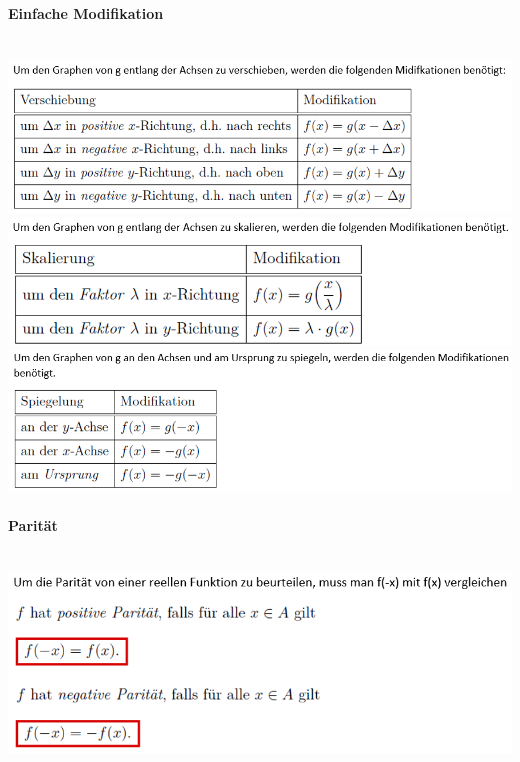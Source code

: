 \paragraph{Einfache Modifikation}\mbox{}\\
\noindent
\includegraphics[width=\columnwidth]{./images/mod.png}
\includegraphics[width=\columnwidth]{./images/mod1.png}
\includegraphics[width=\columnwidth]{./images/mod2.png}
\vspace{1mm}

\paragraph{Parität}\mbox{}\\
\noindent
\includegraphics[width=\columnwidth]{./images/paritat.png}
\vspace{1mm}

